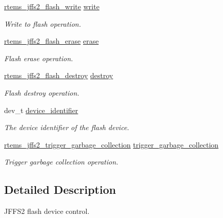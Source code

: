\begin{DoxyCompactItemize}
\mbox{\hyperlink{group__JFFS2_gaf1353f456ea63b4a2c66881c001e6593}{rtems\+\_\+jffs2\+\_\+flash\+\_\+write}} \mbox{\hyperlink{structrtems__jffs2__flash__control_ab34264da7c8f5470adc2108117e11382}{write}}
\begin{DoxyCompactList}\small\item\em Write to flash operation. \end{DoxyCompactList}\item 
\mbox{\label{structrtems__jffs2__flash__control_a2f597c7cb034ad6fc1ada4d6f37fe171}} 
\mbox{\hyperlink{group__JFFS2_ga0dd6899e74b1d84287f44dc9296084e9}{rtems\+\_\+jffs2\+\_\+flash\+\_\+erase}} \mbox{\hyperlink{structrtems__jffs2__flash__control_a2f597c7cb034ad6fc1ada4d6f37fe171}{erase}}
\begin{DoxyCompactList}\small\item\em Flash erase operation. \end{DoxyCompactList}\item 
\mbox{\hyperlink{group__JFFS2_gad29663a4ea8c8bee3ca505f648dfe564}{rtems\+\_\+jffs2\+\_\+flash\+\_\+destroy}} \mbox{\hyperlink{structrtems__jffs2__flash__control_aaf6cdd218f0b74fbf4b7f99cae81207e}{destroy}}
\begin{DoxyCompactList}\small\item\em Flash destroy operation. \end{DoxyCompactList}\item 
dev\+\_\+t \mbox{\hyperlink{structrtems__jffs2__flash__control_aec8894822a4c1b524b6bd76de82204e0}{device\+\_\+identifier}}
\begin{DoxyCompactList}\small\item\em The device identifier of the flash device. \end{DoxyCompactList}\item 
\mbox{\hyperlink{group__JFFS2_ga3abb194d2d804eb99116694f8204afaf}{rtems\+\_\+jffs2\+\_\+trigger\+\_\+garbage\+\_\+collection}} \mbox{\hyperlink{structrtems__jffs2__flash__control_a17585e3c9fe032117f98c3b832fdcd09}{trigger\+\_\+garbage\+\_\+collection}}
\begin{DoxyCompactList}\small\item\em Trigger garbage collection operation. \end{DoxyCompactList}\end{DoxyCompactItemize}


\subsection{Detailed Description}
J\+F\+F\+S2 flash device control. 

